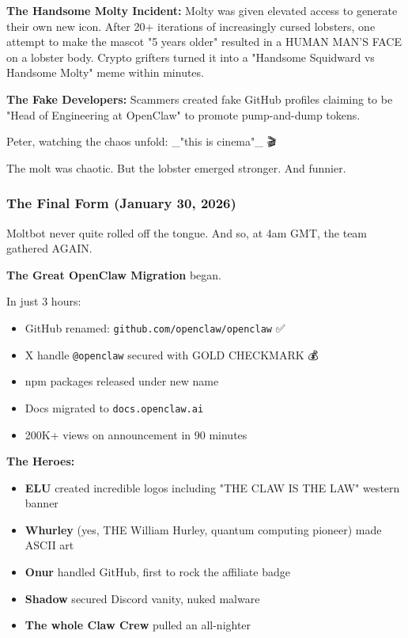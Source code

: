 \textbf{The Handsome Molty Incident:} Molty was given elevated access to generate their own new icon. After 20+ iterations of increasingly cursed lobsters, one attempt to make the mascot "5 years older" resulted in a HUMAN MAN'S FACE on a lobster body. Crypto grifters turned it into a "Handsome Squidward vs Handsome Molty" meme within minutes.

\textbf{The Fake Developers:} Scammers created fake GitHub profiles claiming to be "Head of Engineering at OpenClaw" to promote pump-and-dump tokens.

Peter, watching the chaos unfold: \_"this is cinema"\_ 🎬

The molt was chaotic. But the lobster emerged stronger. And funnier.

\subsubsection{The Final Form (January 30, 2026)}


Moltbot never quite rolled off the tongue. And so, at 4am GMT, the team gathered AGAIN.

\textbf{The Great OpenClaw Migration} began.

In just 3 hours:

\begin{itemize}
  \item GitHub renamed: \texttt{github.com/openclaw/openclaw} ✅
  \item X handle \texttt{@openclaw} secured with GOLD CHECKMARK 💰
  \item npm packages released under new name
  \item Docs migrated to \texttt{docs.openclaw.ai}
  \item 200K+ views on announcement in 90 minutes
\end{itemize}


\textbf{The Heroes:}

\begin{itemize}
  \item \textbf{ELU} created incredible logos including "THE CLAW IS THE LAW" western banner
  \item \textbf{Whurley} (yes, THE William Hurley, quantum computing pioneer) made ASCII art
  \item \textbf{Onur} handled GitHub, first to rock the affiliate badge
  \item \textbf{Shadow} secured Discord vanity, nuked malware
  \item \textbf{The whole Claw Crew} pulled an all-nighter
\end{itemize}


